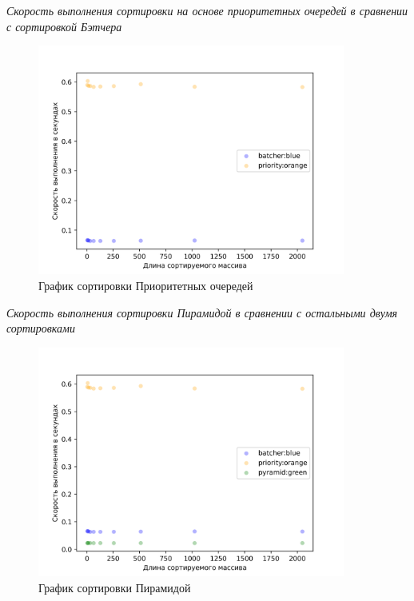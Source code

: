 \textit{Скорость выполнения сортировки на основе приоритетных очередей в сравнении с сортировкой Бэтчера}

\begin{figure}[H]
    \centering
    \includegraphics[width=0.9\textwidth]{./plots/priority_speed_delta.png}
    \caption{График сортировки Приоритетных очередей}
\end{figure}



\textit{Скорость выполнения сортировки Пирамидой в сравнении с остальными двумя сортировками}

\begin{figure}[H]
    \centering
    \includegraphics[width=0.9\textwidth]{./plots/bitonic_speed_delta.png}
    \caption{График сортировки Пирамидой}
\end{figure}










